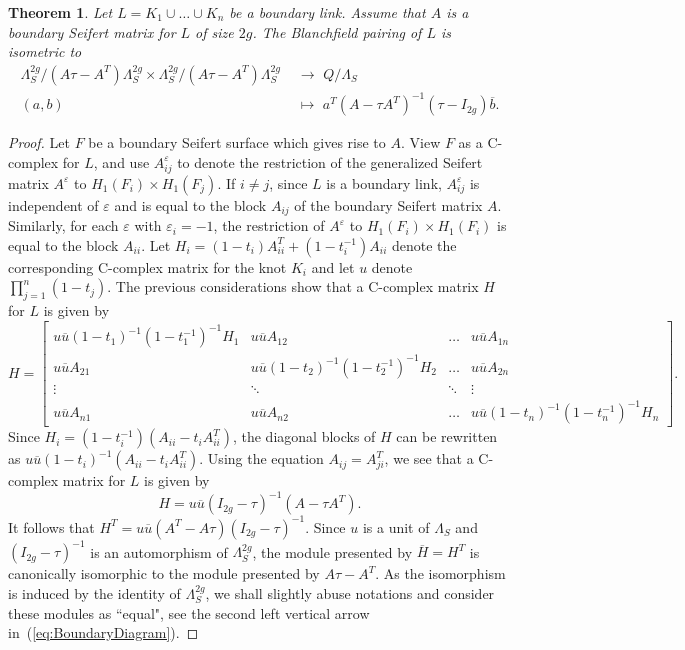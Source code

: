 \documentclass[11pt,a4paper]{amsart}
\newtheorem{theorem}{Theorem}[section]
\theoremstyle{definition}
\begin{document}
\begin{theorem}
\label{thm:Boundary}
Let $L=K_1 \cup \ldots \cup K_n$ be a boundary link. Assume that $A$ is a boundary Seifert matrix for $L$ of size $2g$. The Blanchfield pairing of $L$ is isometric to 
\begin{align*}
\label{eq:Boundary}
\Lambda_S^{2g} / (A\tau -A^T) \Lambda_S^{2g} \times \Lambda_S ^{2g} / (A\tau -A^T) \Lambda_S^{2g} &\,\,\rightarrow\,\, Q/\Lambda_S \\
(a,b) &\,\,\mapsto\,\, a^T (A-\tau A^T)^{-1}(\tau-I_{2g})\overline{b}. \nonumber
\end{align*}
\end{theorem}
\begin{proof}
Let $F$ be a boundary Seifert surface which gives rise to $A$. View $F$ as a C-complex for $L$, and use $A_{ij}^\varepsilon$ to denote the restriction of the generalized Seifert matrix $A^\varepsilon$ to $H_1(F_i) \times H_1(F_j)$. If $i \neq j$, since $L$ is a boundary link, $A_{ij}^\varepsilon$ is independent of $\varepsilon$ and is equal to the block $A_{ij}$ of the boundary Seifert matrix $A$. Similarly, for each $\varepsilon$ with $\varepsilon_i=-1$, the restriction of $A^\varepsilon$ to $H_1(F_i) \times H_1(F_i)$ is equal to the block $A_{ii}$. Let $H_i=(1-t_i)A_{ii}^T+(1-t_i^{-1})A_{ii}$ denote the corresponding C-complex matrix for the knot $K_i$ and let $u$ denote $\prod_{j=1}^n(1-t_j)$. The previous considerations show that a C-complex matrix $H$ for $L$ is given by 
$$
H=
\begin{bmatrix}
u\overline{u}(1-t_1)^{-1}(1-t_1^{-1})^{-1}H_1 &u\overline{u} A_{12} & \ldots & u\overline{u} A_{1n} \\
u\overline{u} A_{21} & u\overline{u}(1-t_2)^{-1}(1-t_2^{-1})^{-1}H_2 & \ldots & u\overline{u} A_{2n} \\
\vdots & \ddots & \ddots& \vdots \\
u\overline{u} A_{n1} & u\overline{u} A_{n2} & \ldots & u\overline{u}(1-t_n)^{-1}(1-t_n^{-1})^{-1}H_n
\end{bmatrix}.$$
Since $H_i=(1-t_i^{-1})(A_{ii}-t_iA_{ii}^T)$, the diagonal blocks of $H$ can be rewritten as $u\overline{u} (1-t_i)^{-1} (A_{ii}-t_iA_{ii}^T)$. Using the equation $A_{ij}=A_{ji}^T$, we see that a C-complex matrix for $L$ is given by
\begin{equation}
\label{eq:BoundaryComput}
H=u\overline{u} (I_{2g}-\tau)^{-1} (A-\tau A^T).
\end{equation}
It follows that $H^T=u \overline{u}(A^T-A\tau )(I_{2g}-\tau)^{-1}$. Since $u$ is a unit of $\Lambda_S$ and $(I_{2g}-\tau)^{-1}$ is an automorphism of $\Lambda_S^{2g}$, the module presented by $\overline{H}=H^T$ is canonically isomorphic to the module presented by $A\tau -A^T$. As the isomorphism is induced by the identity of $\Lambda_S^{2g}$, we shall slightly abuse notations and consider these modules as ``equal", see the second left vertical arrow in~(\ref{eq:BoundaryDiagram}).


\end{proof}
\end{document}
